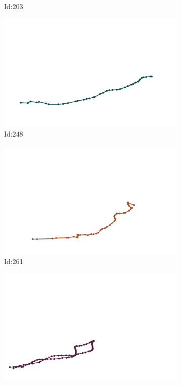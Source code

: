\documentclass[12pt,twoside]{report}
\begin{document}
\begin{figure}
\begin{subfigure}[b]{0.20\textwidth}
\caption{Id:203}
\end{subfigure}
\begin{subfigure}[b]{0.20\textwidth}
\centering
\includegraphics[width=\textwidth]{../trajectories/248.png}
\caption{Id:248}
\end{subfigure}
\begin{subfigure}[b]{0.20\textwidth}
\centering
\includegraphics[width=\textwidth]{../trajectories/261.png}
\caption{Id:261}
\end{subfigure}
\begin{subfigure}[b]{0.20\textwidth}
\centering
\includegraphics[width=\textwidth]{../trajectories/393.png}

\end{subfigure}
\end{figure}
\end{document}
